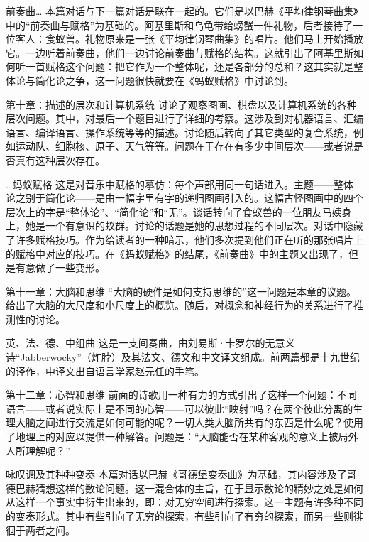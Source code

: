\begin{overview}

\item[前奏曲…]本篇对话与下一篇对话是联在一起的。它们是以巴赫《平均律钢琴曲集》中的“前奏曲与赋格”为基础的。阿基里斯和乌龟带给螃蟹一件礼物，后者接待了一位客人：食蚁兽。礼物原来是一张《平均律钢琴曲集》的唱片。他们马上开始播放它。一边听着前奏曲，他们一边讨论前奏曲与赋格的结构。这就引出了阿基里斯如何听一首赋格这个问题：把它作为一个整体呢，还是各部分的总和？这其实就是整体论与简化论之争，这一问题很快就要在《蚂蚁赋格》中讨论到。

\item[第十章：描述的层次和计算机系统]讨论了观察图画、棋盘以及计算机系统的各种层次问题。其中，对最后一个题目进行了详细的考察。这涉及到对机器语言、汇编语言、编译语言、操作系统等等的描述。讨论随后转向了其它类型的复合系统，例如运动队、细胞核、原子、天气等等。问题在于存在有多少中间层次——或者说是否真有这种层次存在。

\item[…蚂蚁赋格]这是对音乐中赋格的摹仿：每个声部用同一句话进入。主题——整体论之别于简化论——是由一幅字里有字的递归图画引入的。这幅古怪图画中的四个层次上的字是“整体论”、“简化论”和“无”。谈话转向了食蚁兽的一位朋友马姨身上，她是一个有意识的蚁群。讨论的话题是她的思想过程的不同层次。对话中隐藏了许多赋格技巧。作为给读者的一种暗示，他们多次提到他们正在听的那张唱片上的赋格中对应的技巧。在《蚂蚁赋格》的结尾，《前奏曲》中的主题又出现了，但是有意做了一些变形。

\item[第十一章：大脑和思维]“大脑的硬件是如何支持思维的”这一问题是本章的议题。给出了大脑的大尺度和小尺度上的概览。随后，对概念和神经行为的关系进行了推测性的讨论。

\item[英、法、德、中组曲]这是一支间奏曲，由刘易斯·卡罗尔的无意义诗“Jabberwocky”（炸脖）及其法文、德文和中文译文组成。前两篇都是十九世纪的译作，中译文出自语言学家赵元任的手笔。

\item[第十二章：心智和思维]前面的诗歌用一种有力的方式引出了这样一个问题：不同语言——或者说实际上是不同的心智——可以彼此“映射”吗？在两个彼此分离的生理大脑之间进行交流是如何可能的呢？一切人类大脑所共有的东西是什么呢？使用了地理上的对应以提供一种解答。问题是：“大脑能否在某种客观的意义上被局外人所理解呢？”

\item[咏叹调及其种种变奏]本篇对话以巴赫《哥德堡变奏曲》为基础，其内容涉及了哥德巴赫猜想这样的数论问题。这一混合体的主旨，在于显示数论的精妙之处是如何从这样一个事实中衍生出来的，即：对无穷空间进行探索。这一主题有许多种不同的变奏形式。其中有些引向了无穷的探索，有些引向了有穷的探索，而另一些则徘徊于两者之间。


\end{overview}
